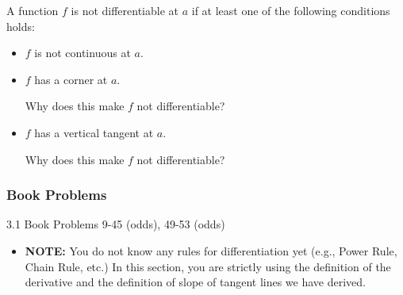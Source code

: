 \documentclass[Cal1Spr16Lectures.tex]{subfiles}
\begin{document}
\begin{frame}{}
A function $f$ is \alert{not} differentiable at $a$ if at least one of the following conditions holds:
\begin{itemize}
\item[1.] $f$ is not continuous at $a$.
\item[2.] $f$ has a corner at $a$.  
\begin{que} Why does this make $f$ not differentiable? \end{que}
\item[3.] $f$ has a vertical tangent at $a$.  
\begin{que} Why does this make $f$ not differentiable? \end{que}
\end{itemize}
\end{frame}

\subsubsection{Book Problems}

\begin{frame}
\begin{block}{3.1 Book Problems} 9-45 (odds), 49-53 (odds) \end{block}
\begin{itemize}
\item {\bf NOTE:}  You do not know any rules for differentiation yet (e.g., Power Rule, Chain Rule, etc.)  In this section, you are strictly using the definition of the derivative and the definition of slope of tangent lines we have derived.
\end{itemize}
\end{frame}
\end{document}
